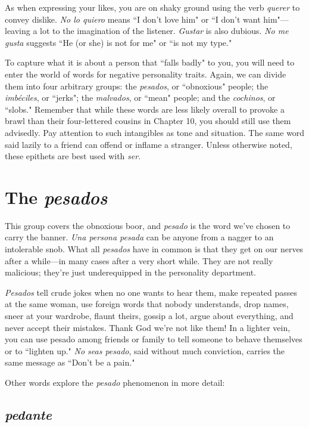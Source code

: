 As when expressing your likes, you are on shaky ground using
the verb \emph{querer} to convey dislike. \emph{No lo quiero} means ``I don't love
him" or ``I don't want him"---leaving a lot to the imagination of the
listener. \emph{Gustar} is also dubious. \emph{No me gusta} suggests ``He (or she) is
not for me" or ``is not my type."

To capture what it is about a person that ``falls badly" to you,
you will need to enter the world of words for negative personality
traits. Again, we can divide them into four arbitrary groups: the \emph{pesados}, or ``obnoxious" people; the \emph{imbéciles}, or ``jerks"; the \emph{malvados},
or ``mean" people; and the \emph{cochinos}, or ``slobs." Remember that while
these words are less likely overall to provoke a brawl than their
four-lettered cousins in Chapter 10, you should still use them advisedly.
Pay attention to such intangibles as tone and situation. The same word
said lazily to a friend can offend or inflame a stranger. Unless otherwise noted, these epithets are best used with \emph{ser}.

\section{The \emph{pesados}}

This group covers the obnoxious boor, and \emph{pesado} is the word
we've chosen to carry the banner. \emph{Una persona pesada} can be anyone
from a nagger to an intolerable snob. What all \emph{pesados} have in common is that they get on our nerves after a while---in many cases after
a very short while. They are not really malicious; they're just underequipped in the personality department.

\emph{Pesados} tell crude jokes when no one wants to hear them,
make repeated passes at the same woman, use foreign words that nobody understands, drop names, sneer at your wardrobe, flaunt theirs,
gossip a lot, argue about everything, and never accept their mistakes.
Thank God we're not like them! In a lighter vein, you can use pesado
among friends or family to tell someone to behave themselves or to
``lighten up." \emph{No seas pesado}, said without much conviction, carries
the same message as ``Don't be a pain."

Other words explore the \emph{pesado} phenomenon in more detail:

\subsection{\emph{pedante}}

